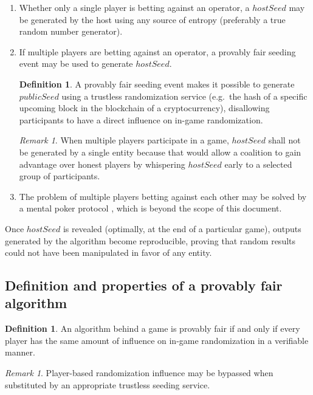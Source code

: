 \documentclass[a4paper]{article}
\theoremstyle{definition}
\newtheorem{definition}[algorithm]{Definition}
\theoremstyle{remark}
\newtheorem{remark}[algorithm]{Remark}
\begin{document}
\begin{enumerate}[label=(\alph*)]
\item Whether only a single player is betting against an operator, a \(hostSeed\) may be generated by the host using any source of entropy (preferably a true random number generator).

\item If multiple players are betting against an operator, a provably fair seeding event may be used to generate \(hostSeed\).

\begin{definition}
A provably fair seeding event \cite{seedingevent2015} makes it possible to generate \(publicSeed\) using a trustless randomization service (e.g.\ the hash of a specific upcoming block in the blockchain of a cryptocurrency), disallowing participants to have a direct influence on in-game randomization.
\end{definition}

\begin{remark}
When multiple players participate in a game, \(hostSeed\) shall not be generated by a single entity because that would allow a coalition to gain advantage over honest players by whispering \(hostSeed\) early to a selected group of participants.
\end{remark}

\item The problem of multiple players betting against each other may be solved by a mental poker protocol \cite{shamir1981}, which is beyond the scope of this document.
\end{enumerate}

Once \(hostSeed\) is revealed (optimally, at the end of a particular game), outputs generated by the algorithm become reproducible, proving that random results could not have been manipulated in favor of any entity.

\subsection{Definition and properties of a provably fair algorithm}
\begin{definition}
An algorithm behind a game is provably fair if and only if every player has the same amount of influence on in-game randomization in a verifiable manner.

\begin{remark}
Player-based randomization influence may be bypassed when substituted by an appropriate trustless seeding service.
\end{remark}
\end{definition}
\end{document}
